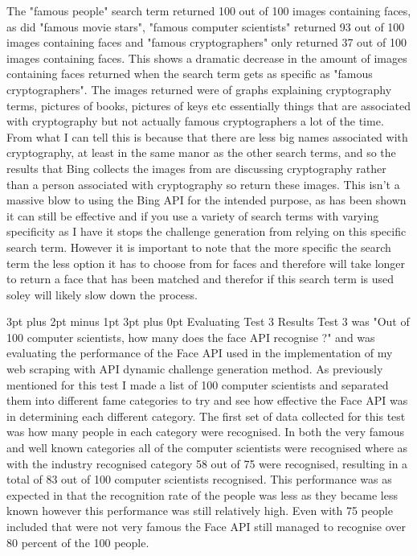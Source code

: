 \documentclass[12pt,a4paper]{article}
\makeatletter
\renewcommand\subsection{\@startsection {subsection}{1}{2mm} %
                               {3pt plus 2pt minus 1pt} %
                               {3pt plus 0pt} %
                               {\normalfont\bfseries}}
\makeatother
\begin{document}
The "famous people" search term returned 100 out of 100 images containing faces, as did "famous movie stars", "famous computer scientists" returned 93 out of 100 images containing faces and "famous cryptographers" only returned 37 out of 100 images containing faces. This shows a dramatic decrease in the amount of images containing faces returned when the search term gets as specific as "famous cryptographers". The images returned were of graphs explaining cryptography terms, pictures of books, pictures of keys etc essentially things that are associated with cryptography but not actually famous cryptographers a lot of the time. From what I can tell this is because that there are less big names associated with cryptography, at least in the same manor as the other search terms, and so the results that Bing collects the images from are discussing cryptography rather than a person associated with cryptography so return these images. This isn't a massive blow to using the Bing API for the intended purpose, as has been shown it can still be effective and if you use a variety of search terms with varying specificity as I have it stops the challenge generation from relying on this specific search term. However it is important to note that the more specific the search term the less option it has to choose from for faces and therefore will take longer to return a face that has been matched and therefor if this search term is used soley will likely slow down the process. 

\subsection{Evaluating Test 3 Results}  
Test 3 was "Out of 100 computer scientists, how many does the face API recognise ?" and was evaluating the performance of the Face API used in the implementation of my web scraping with API dynamic challenge generation method. 
As previously mentioned for this test I made a list of 100 computer scientists and separated them into different fame categories to try and see how effective the Face API was in determining each different category. The first set of data collected for this test was how many people in each category were recognised. In both the very famous and well known categories all of the computer scientists were recognised where as with the industry recognised category 58 out of 75 were recognised, resulting in a total of 83 out of 100 computer scientists recognised. This performance was as expected in that the recognition rate of the people was less as they became less known however this performance was still relatively high. Even with 75 people included that were not very famous the Face API still managed to recognise over 80 percent of the 100 people.  
\end{document}
